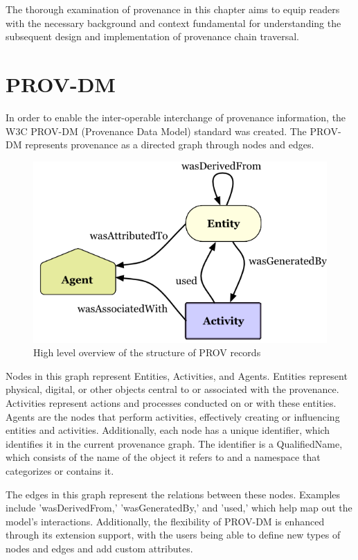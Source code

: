 \documentclass[
  digital,     %
  oneside,     %
  nosansbold,  %
  nocolorbold, %
  lof,         %
  lot,         %
]{fithesis4}
\begin{document}
The thorough examination of provenance in this chapter aims to equip readers with the necessary background and context fundamental for understanding the subsequent design and implementation of provenance chain traversal.

\section{PROV-DM} \label{provdm}
\shorthandoff{-}
In order to enable the inter-operable interchange of provenance information, the W3C PROV-DM (Provenance Data Model) standard was created. The PROV-DM represents provenance as a directed graph through nodes and edges.

\begin{figure}[htbp]
  \begin{center}
    \includegraphics[width=12.5cm]{fithesis/images/provdm-basics.png}
  \end{center}
  \caption{High level overview of the structure of PROV records \cite{provdm-basics}}
  \label{fig:provdm-basics}
\end{figure}

Nodes in this graph represent Entities, Activities, and Agents. Entities represent physical, digital, or other objects central to or associated with the provenance. Activities represent actions and processes conducted on or with these entities. Agents are the nodes that perform activities, effectively creating or influencing entities and activities. Additionally, each node has a unique identifier, which identifies it in the current provenance graph. The identifier is a QualifiedName, which consists of the name of the object it refers to and a namespace that categorizes or contains it.

The edges in this graph represent the relations between these nodes. Examples include 'wasDerivedFrom,' 'wasGeneratedBy,' and 'used,' which help map out the model's interactions. Additionally, the flexibility of PROV-DM is enhanced through its extension support, with the users being able to define new types of nodes and edges and add custom attributes.
\end{document}
